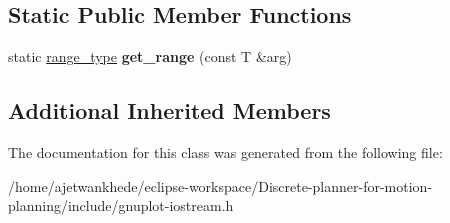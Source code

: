 \subsection*{Static Public Member Functions}
\begin{DoxyCompactItemize}
\item 
\mbox{\label{classgnuplotio_1_1ArrayTraits_3_01T_00_01typename_01boost_1_1enable__if_3_01is__like__stl__conta99f8c9e80e271bc1ed047cdd05794af4_a89d4150ab3c479cde972071a10acd27b}} 
static \mbox{\hyperlink{classgnuplotio_1_1IteratorRange}{range\+\_\+type}} {\bfseries get\+\_\+range} (const T \&arg)
\end{DoxyCompactItemize}
\subsection*{Additional Inherited Members}


The documentation for this class was generated from the following file\+:\begin{DoxyCompactItemize}
\item 
/home/ajetwankhede/eclipse-\/workspace/\+Discrete-\/planner-\/for-\/motion-\/planning/include/gnuplot-\/iostream.\+h\end{DoxyCompactItemize}

